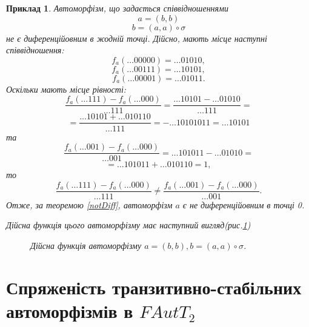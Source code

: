 \documentclass[a4paper,12pt]{article} \usepackage{a4wide}
\numberwithin{equation}{subsection}
\newtheorem{example}{Приклад}[subsection]
\begin{document}
\begin{example}
Автоморфізм, що задається співвідношеннями
$$a = (b,b)$$
$$b = (a,a)\circ \sigma$$
не є диференційовним в жодній точці. Дійсно, мають місце наступні співвідношення:
$$f_a(\dots 00000) = \dots 01010,$$
$$f_a(\dots 00111) = \dots 10101,$$
$$f_a(\dots 00001) = \dots 01011.$$
Оскільки мають місце рівності:
$$\frac{f_a(\dots 111) - f_a(\dots 000) }{\dots 111} = \frac{\dots 10101 - \dots 01010 }{\dots 111} = $$
 $$=  \frac{\dots 10101 + \dots 010110 }{\dots 111}= - \dots 10101011 = \dots 10101 $$
та
$$\frac{f_a(\dots 001) - f_a(\dots 000) }{\dots 001} = \dots 101011 - \dots 01010  = $$
 $$=  \dots 101011 + \dots 010110 = 1, $$
то $$\frac{f_a(\dots 111) - f_a(\dots 000) }{\dots 111} \neq \frac{f_a(\dots 001) - f_a(\dots 000) }{\dots 001}. $$
Отже, за теоремою \ref{notDiff}, автоморфізм $a$ є не диференційовним в точці 0.

Дійсна функція цього автоморфізму має наступний вигляд(рис.\ref{matrix_araa_braas})
\begin{figure}[h!]
\caption{Дійсна функція автоморфізму $a = (b,b), b = (a,a)\circ \sigma$.}
\label{matrix_araa_braas}
\end{figure}


\end{example}


\newpage
 \section{Спряженість транзитивно-стабільних автоморфізмів в $FAutT_2$}
\end{document}

